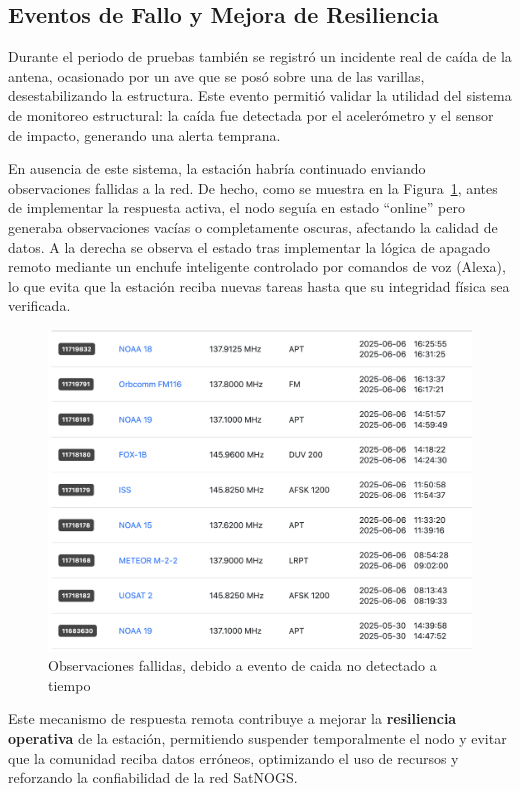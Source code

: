 \documentclass[conference]{IEEEtran}
\begin{document}
\subsection{Eventos de Fallo y Mejora de Resiliencia}

Durante el periodo de pruebas también se registró un incidente real de caída de la antena, ocasionado por un ave que se posó sobre una de las varillas, desestabilizando la estructura. Este evento permitió validar la utilidad del sistema de monitoreo estructural: la caída fue detectada por el acelerómetro y el sensor de impacto, generando una alerta temprana.

En ausencia de este sistema, la estación habría continuado enviando observaciones fallidas a la red. De hecho, como se muestra en la Figura~\ref{fig:FailObservations}, antes de implementar la respuesta activa, el nodo seguía en estado “online” pero generaba observaciones vacías o completamente oscuras, afectando la calidad de datos. A la derecha se observa el estado tras implementar la lógica de apagado remoto mediante un enchufe inteligente controlado por comandos de voz (Alexa), lo que evita que la estación reciba nuevas tareas hasta que su integridad física sea verificada.

\begin{figure}[H]
  \centering
  \includegraphics[width=0.85\linewidth]{figs/FailObservations.png}
  \caption{Observaciones fallidas, debido a evento de caida no detectado a tiempo}
  \label{fig:FailObservations}
\end{figure}

Este mecanismo de respuesta remota contribuye a mejorar la \textbf{resiliencia operativa} de la estación, permitiendo suspender temporalmente el nodo y evitar que la comunidad reciba datos erróneos, optimizando el uso de recursos y reforzando la confiabilidad de la red SatNOGS.
\end{document}
